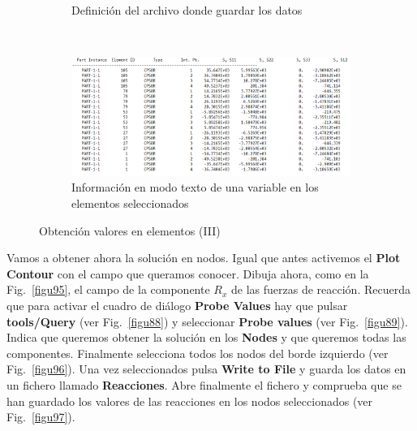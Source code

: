 \begin{enumerate}
\begin{figure}[H]
\begin{subfigure}{0.32\textwidth}
     \caption{Definición del archivo donde guardar los datos}
     \label{figu93}
   \end{subfigure}%
   ~ %
   \begin{subfigure}{0.35\textwidth}
     \includegraphics[width=\textwidth]{./body/images/imagen94}
     \caption{Información en modo texto de una variable en los
       elementos seleccionados}
     \label{figu94}
   \end{subfigure}%
   \caption{Obtención valores en elementos (III)}
 \end{figure}

 Vamos a obtener ahora la solución en nodos. Igual que antes activemos
 el \textbf{Plot Contour} con el campo que queramos conocer. Dibuja
 ahora, como en la Fig.~\ref{figu95}, el campo de la componente
 $R_{x}$ de las fuerzas de reacción. Recuerda que para activar el
 cuadro de diálogo \textbf{Probe Values} hay que pulsar
 \textbf{tools/Query} (ver Fig.~\ref{figu88}) y seleccionar
 \textbf{Probe values} (ver Fig.~\ref{figu89}). Indica que queremos
 obtener la solución en los \textbf{Nodes} y que queremos todas las
 componentes. Finalmente selecciona todos los nodos del borde
 izquierdo (ver Fig.~\ref{figu96}). Una vez seleccionados pulsa
 \textbf{Write to File} y guarda los datos en un fichero llamado
 \textbf{Reacciones}. Abre finalmente el fichero y comprueba que se
 han guardado los valores de las reacciones en los nodos seleccionados
 (ver Fig.~\ref{figu97}).


\end{enumerate}
